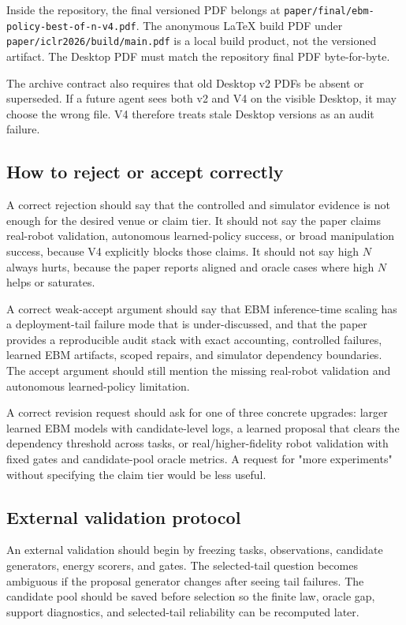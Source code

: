 Inside the repository, the final versioned PDF belongs at
\texttt{paper/final/ebm-policy-best-of-n-v4.pdf}. The anonymous LaTeX build
PDF under \texttt{paper/iclr2026/build/main.pdf} is a local build product, not
the versioned artifact. The Desktop PDF must match the repository final PDF
byte-for-byte.

The archive contract also requires that old Desktop v2 PDFs be absent or
superseded. If a future agent sees both v2 and V4 on the visible Desktop, it
may choose the wrong file. V4 therefore treats stale Desktop versions as an
audit failure.

\subsection{How to reject or accept correctly}
\label{app:V4-reject-accept}

A correct rejection should say that the controlled and simulator evidence is
not enough for the desired venue or claim tier. It should not say the paper
claims real-robot validation, autonomous learned-policy success, or broad
manipulation success, because V4 explicitly blocks those claims. It should not
say high \(N\) always hurts, because the paper reports aligned and oracle
cases where high \(N\) helps or saturates.

A correct weak-accept argument should say that EBM inference-time scaling has
a deployment-tail failure mode that is under-discussed, and that the paper
provides a reproducible audit stack with exact accounting, controlled
failures, learned EBM artifacts, scoped repairs, and simulator dependency
boundaries. The accept argument should still mention the missing real-robot
validation and autonomous learned-policy limitation.

A correct revision request should ask for one of three concrete upgrades:
larger learned EBM models with candidate-level logs, a learned proposal that
clears the dependency threshold across tasks, or real/higher-fidelity robot
validation with fixed gates and candidate-pool oracle metrics. A request for
"more experiments" without specifying the claim tier would be less useful.

\subsection{External validation protocol}
\label{app:V4-external-protocol}

An external validation should begin by freezing tasks, observations, candidate
generators, energy scorers, and gates. The selected-tail question becomes
ambiguous if the proposal generator changes after seeing tail failures. The
candidate pool should be saved before selection so the finite law, oracle gap,
support diagnostics, and selected-tail reliability can be recomputed later.

